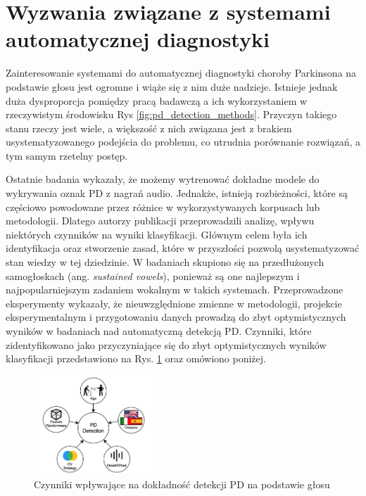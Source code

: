 \section{Wyzwania związane z systemami automatycznej diagnostyki}\label{sec:wyzwania}

Zainteresowanie systemami do automatycznej diagnostyki choroby Parkinsona na podstawie głosu jest ogromne i wiąże się z nim duże nadzieje.
Istnieje jednak duża dysproporcja pomiędzy pracą badawczą a ich wykorzystaniem w rzeczywistym środowisku Rys \ref{fig:pd_detection_methods}.
Przyczyn takiego stanu rzeczy jest wiele, a większość z nich związana jest z brakiem usystematyzowanego podejścia do problemu, co utrudnia porównanie
rozwiązań, a tym samym rzetelny postęp.

Ostatnie badania wykazały, że możemy wytrenować dokładne modele do wykrywania oznak PD z nagrań audio.
Jednakże, istnieją rozbieżności, które są częściowo powodowane przez różnice w
wykorzystywanych korpusach lub metodologii.
Dlatego autorzy publikacji \cite{SustainedVowelsProblems} przeprowadzili analizę, wpływu niektórych czynników na wyniki klasyfikacji.
Głównym celem była ich identyfikacja oraz stworzenie zasad, które w przyszłości pozwolą usystematyzować stan wiedzy w tej dziedzinie.
W badaniach skupiono się na przedłużonych samogłoskach (ang. \emph{sustained vowels}), ponieważ są one najlepszym i najpopularniejszym zadaniem
wokalnym w takich systemach.
Przeprowadzone eksperymenty wykazały, że nieuwzględnione zmienne w metodologii, projekcie eksperymentalnym i
przygotowaniu danych prowadzą do zbyt optymistycznych wyników w badaniach nad automatyczną detekcją PD.
Czynniki, które zidentyfikowano jako przyczyniające się do zbyt optymistycznych wyników klasyfikacji
przedstawiono na Rys. \ref{fig:factors_PD_detection} oraz omówiono poniżej.


\begin{figure}[htbp]
	\centering
	\includegraphics[width=0.4\textwidth]{./img/influence_of_factors_on_PD_detection}
	\caption{Czynniki wpływające na dokładność detekcji PD na podstawie głosu \cite{SustainedVowelsProblems}}
    \label{fig:factors_PD_detection}
\end{figure}


